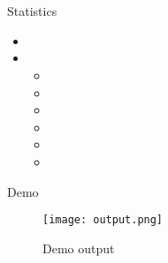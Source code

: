 \documentclass{beamer}
\begin{document}
\section{}

\begin{frame}{\huge Statistics}
\begin{itemize}
\item 
\item 
\begin{itemize}
\item 
\item 
\item 
\item 
\item 
\item 
\end{itemize}
\end {itemize}
\end{frame}
\begin{frame}{\huge Demo}
\begin{figure}[C:\Users\Adithya\Desktop]
    \centering
    \texttt{[image: output.png]}
    \caption{Demo output}
    \label{fig:demo1}
\end{figure}
\end{frame}

\subsection{}
\begin{frame}
\end{frame}
\end{document}
